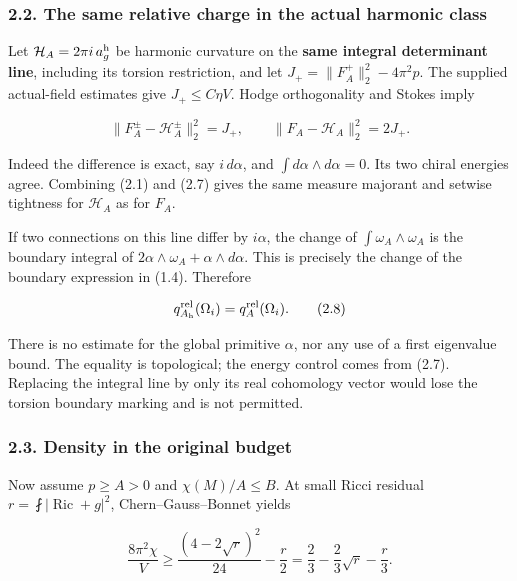 \documentclass[
  11pt,
]{article}
\begin{document}
\hypertarget{the-same-relative-charge-in-the-actual-harmonic-class}{%
\subsubsection{2.2. The same relative charge in the actual harmonic
class}\label{the-same-relative-charge-in-the-actual-harmonic-class}}

Let \(\mathcal H_A=2\pi i\,a_g^{\rm h}\) be harmonic curvature on the
\textbf{same integral determinant line}, including its torsion
restriction, and let \(J_+=\|F_A^+\|_2^2-4\pi^2p\). The supplied
actual-field estimates give \(J_+\le C\eta V\). Hodge orthogonality and
Stokes imply

\[
 \boxed{\|F_A^\pm-\mathcal H_A^\pm\|_2^2=J_+,\qquad
              \|F_A-\mathcal H_A\|_2^2=2J_+.}
 \tag{2.7}
\]

Indeed the difference is exact, say \(i\,d\alpha\), and
\(\int d\alpha\wedge d\alpha=0\). Its two chiral energies agree.
Combining (2.1) and (2.7) gives the same measure majorant and setwise
tightness for \(\mathcal H_A\) as for \(F_A\).

If two connections on this line differ by \(i\alpha\), the change of
\(\int\omega_A\wedge\omega_A\) is the boundary integral of
\(2\alpha\wedge\omega_A+\alpha\wedge d\alpha\). This is precisely the
change of the boundary expression in (1.4). Therefore

\[
            q_{A_{\rm h}}^{\rm rel}(\Omega_i)=q_A^{\rm rel}(\Omega_i).
 \tag{2.8}
\]

There is no estimate for the global primitive \(\alpha\), nor any use of
a first eigenvalue bound. The equality is topological; the energy
control comes from (2.7). Replacing the integral line by only its real
cohomology vector would lose the torsion boundary marking and is not
permitted.

\hypertarget{density-in-the-original-budget}{%
\subsubsection{2.3. Density in the original
budget}\label{density-in-the-original-budget}}

Now assume \(p\ge A>0\) and \(\chi(M)/A\le B\). At small Ricci residual
\(r=\fint|\operatorname{Ric}+g|^2\), Chern--Gauss--Bonnet yields

\[
 \frac{8\pi^2\chi}V\ge
 \frac{(4-2\sqrt r)^2}{24}-\frac r2
                 =\frac23-\frac23\sqrt r-\frac r3.
 \tag{2.9}
\]
\end{document}
